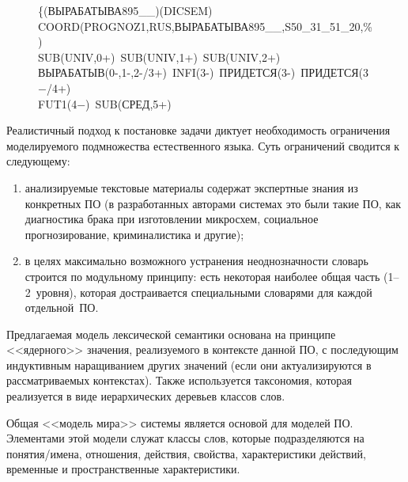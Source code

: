 \begin{multicols}{2}
     \begin{figure*} %
\hspace*{23mm}\{(ВЫРАБАТЫВА895\_\_)(DICSEM)\\
\hspace*{23mm}COORD(PROGNOZ1,RUS,ВЫРАБАТЫВА895\_\_,S50\_31\_51\_20,\%)\\
\hspace*{23mm}SUB(UNIV,0+)~SUB(UNIV,1+)~SUB(UNIV,2+)\\
\hspace*{23mm}ВЫРАБАТЫВ(0-,1-,2-/3+)~INFI(3-)~ПРИДЕТСЯ(3-)~ПРИДЕТСЯ(3$-$/4+) \\
\hspace*{23mm}FUT1(4$-$)~SUB(СРЕД,5+)
\end{figure*}

     Реалистичный подход к постановке задачи диктует необходимость 
ограничения моделируемого подмножества естественного языка. Суть 
ограничений сводится к следующему:
     \begin{enumerate}[(1)]
     \item анализируемые текстовые материалы содержат 
экспертные знания из конкретных ПО (в разработанных 
авторами системах это были такие ПО, как диагностика 
брака при изготовлении микросхем, социальное прогнозирование, 
криминалистика и другие);
     \item в целях максимально возможного устранения 
неоднозначности словарь строится по модульному принципу: есть некоторая 
наиболее общая часть (1--2~уровня), которая достраивается специальными 
словарями для каж\-дой отдельной~ПО.
     \end{enumerate}
     
     Предлагаемая модель лексической семантики основана на принципе 
<<ядерного>> значения, реализуемого в контексте данной 
ПО, с последующим индуктивным наращиванием других значений (если 
они актуализируются в рас\-смат\-ри\-ва\-емых контекстах). Также используется 
таксономия, которая реализуется в виде иерархических деревьев классов 
слов. 
     
     Общая <<модель мира>> системы является основой для моделей ПО. 
Элементами этой модели служат классы слов, которые подразделяются на 
понятия/имена, отношения, действия, свойства, характеристики действий, 
временные и пространственные характеристики.
     

\end{multicols}
